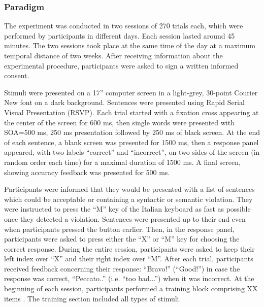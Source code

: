 \subsubsection{Paradigm}
The experiment was conducted in two sessions of 270 trials each, which were performed by participants in different days. Each session lasted around 45 minutes. The two sessions took place at the same time of the day at a maximum temporal distance of two weeks. After receiving information about the experimental procedure, participants were asked to sign a written informed consent. 

Stimuli were presented on a 17” computer screen in a light-grey, 30-point Courier New font on a dark background. Sentences were presented using Rapid Serial Visual Presentation (RSVP). Each trial started with a fixation cross appearing at the center of the screen for 600 ms, then single words were presented with SOA=500 ms, 250 ms presentation followed by 250 ms of black screen. At the end of each sentence, a blank screen was presented for 1500 ms, then a response panel appeared, with two labels “correct” and “incorrect”, on two sides of the screen (in random order each time) for a maximal duration of 1500 ms. A final screen, showing accuracy feedback was presented for 500 ms.

Participants were informed that they would be presented with a list of sentences which could be acceptable or containing a syntactic or semantic violation. They were instructed to press the “M” key of the Italian keyboard as fast as possible once they detected a violation. Sentences were presented up to their end even when participants pressed the button earlier. Then, in the response panel, participants were asked to press either the “X” or “M” key for choosing the correct response. During the entire session, participants were asked to keep their left index over “X” and their right index over “M”. After each trial, participants received feedback concerning their response: ``Bravo!'' (``Good!'') in  case the response was correct, ``Peccato..'' (i.e. ``too bad...'') when it was incorrect. At the beginning of each session, participants performed a training block comprising XX items . The training section included all types of stimuli.

